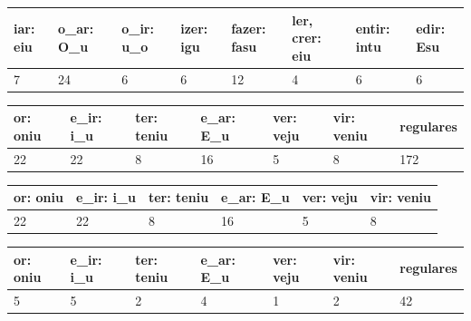\begin{table}[H]
\begin{center}
\begin{tabular}{llllllll}
iar: eiu & o\_ar: O\_u & o\_ir: u\_o & izer: igu & fazer: fasu & ler, crer: eiu & entir: intu & edir: Esu \\
\toprule
7        & 24          & 6           & 6         & 12          & 4              & 6           & 6        
\end{tabular}
\end{center}
\end{table}
\label{tab:g1}

\begin{table}[H]
\begin{center}
\begin{tabular}{lllllll}
or: oniu & e\_ir: i\_u & ter: teniu & e\_ar: E\_u & ver: veju & vir: veniu & regulares \\
\toprule
22       & 22          & 8          & 16          & 5         & 8          & 172     
\end{tabular}
\end{center}
\end{table}
\label{tab:g2}

\begin{table}[H]
\begin{center}
\begin{tabular}{llllll}
or: oniu & e\_ir: i\_u & ter: teniu & e\_ar: E\_u & ver: veju & vir: veniu \\
\toprule
22       & 22          & 8          & 16          & 5         & 8\\               
\end{tabular}
\end{center}
\end{table}
\label{tab:g3}

\begin{table}[H]
\begin{center}
\begin{tabular}{lllllll}
or: oniu & e\_ir: i\_u & ter: teniu & e\_ar: E\_u & ver: veju & vir: veniu & regulares \\
\toprule
5        & 5           & 2          & 4           & 1         & 2          & 42      
\end{tabular}
\end{center}
\end{table}
\label{tab:g4}

